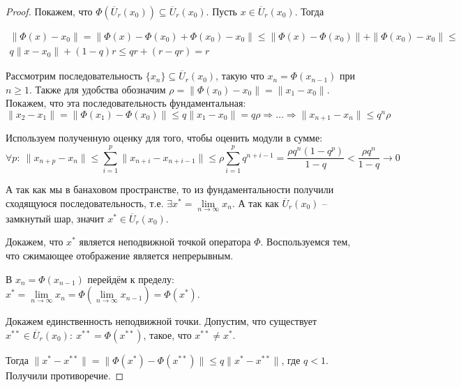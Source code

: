 \documentclass[a4paper,12pt]{article}
\renewcommand{\leq}{\ensuremath{\leqslant}}
\renewcommand{\geq}{\ensuremath{\geqslant}}
\theoremstyle{plain}
\theoremstyle{definition}
\theoremstyle{remark}
\begin{document}
\begin{proof}
	Покажем, что $\Phi(\overline{U}_r(x_0)) \subseteq \overline{U}_r(x_0)$. Пусть $x \in \overline{U}_r(x_0)$. Тогда

	\begin{align*}
		\|\Phi(x) - x_0\| = \|\Phi(x) - \Phi(x_0) + \Phi(x_0) - x_0\| \leq \|\Phi(x) - \Phi(x_0)\| + \|\Phi(x_0) - x_0\| \leq \\
		q\|x - x_0\| + (1 - q)r \leq qr + (r - qr) = r
	\end{align*}

	Рассмотрим последовательность $\{x_n\} \subseteq \overline{U}_r(x_0)$, такую что $x_n = \Phi(x_{n - 1})$ при $n \geq 1$. Также для удобства обозначим $\rho = \|\Phi(x_0) - x_0\| = \|x_1 - x_0\|$. Покажем, что эта последовательность фундаментальная:
	\[\|x_2 - x_1\| = \|\Phi(x_1) - \Phi(x_0)\| \leq q \|x_1 - x_0\| = q\rho \Rightarrow \ldots \Rightarrow \|x_{n + 1} - x_n\| \leq q^n\rho\]

	Используем полученную оценку для того, чтобы оценить модули в сумме:
	\[\forall p:\: \|x_{n + p} - x_n\| \leq \sum_{i = 1}^p \|x_{n + i} - x_{n + i - 1}\| \leq \rho \sum_{i = 1}^p q^{n + i - 1} = \frac{\rho q^n(1 - q^p)}{1 - q} < \frac{\rho q^n}{1 - q} \to 0\]

	А так как мы в банаховом пространстве, то из фундаментальности получили сходящуюся последовательность, т.е. $\exists x^* = \lim\limits_{n \to \infty} x_n$. А так как $\overline{U}_r(x_0)$ -- замкнутый шар, значит $x^* \in \overline{U}_r(x_0)$.

	Докажем, что $x^*$ является неподвижной точкой оператора $\Phi$. Воспользуемся тем, что сжимающее отображение является непрерывным.

	В $x_n = \Phi(x_{n - 1})$ перейдём к пределу: $x^* = \lim\limits_{n \to \infty} x_n = \Phi\left(\lim\limits_{n \to \infty} x_{n - 1}\right) = \Phi(x^*)$.

	Докажем единственность неподвижной точки. Допустим, что существует $x^{**} \in \overline{U}_r(x_0):\: x^{**} = \Phi(x^{**})$, такое, что $x^{**} \neq x^*$.

	Тогда $\|x^* - x^{**}\| = \|\Phi(x^*) - \Phi(x^{**})\| \leq q\|x^* - x^{**}\|$, где $q < 1$. Получили противоречие.
\end{proof}
\end{document}
